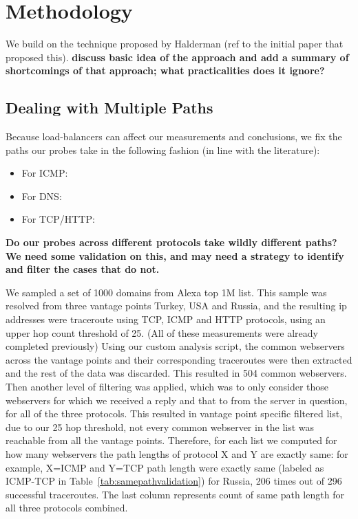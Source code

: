 \section{Methodology}\label{sec:methodology}
We build on the technique proposed by Halderman (ref to the initial paper that
proposed this).
\textbf{ discuss basic idea of the approach and add a summary of shortcomings
of that approach; what practicalities does it ignore?} 

\subsection{Dealing with Multiple Paths}
Because load-balancers can affect our measurements and conclusions, we fix the
paths our probes take in the following fashion (in line with the literature):
\begin{itemize}
    \item For ICMP:
    \item For DNS:
    \item For TCP/HTTP:
\end{itemize}
\textbf{Do our probes across different protocols take wildly different paths?
We need some validation on this, and may need a strategy to identify and filter
the cases that do not.}

We sampled a set of 1000 domains from Alexa top 1M list. This sample was resolved from three vantage points Turkey, USA and Russia, and the resulting ip addresses were traceroute using TCP, ICMP and HTTP protocols, using an upper hop count threshold of 25. (All of these measurements were already completed previously)
Using our custom analysis script, the common webservers across the vantage points and their corresponding traceroutes were then extracted and the rest of the data was discarded. This resulted in 504 common webservers. Then another level of filtering was applied, which was to only consider those webservers for which we received a reply and that to from the server in question, for all of the three protocols.
This resulted in vantage point specific filtered list, due to our 25 hop threshold, not every common webserver in the list was reachable from all the vantage points. Therefore, for each list we computed for how many webservers the path lengths of protocol X and Y are exactly same: for example, X=ICMP and Y=TCP path length were exactly same (labeled as ICMP-TCP in Table~\ref{tab:samepathvalidation}) for Russia, 206 times out of 296 successful traceroutes. The last column represents count of same path length for all three protocols combined.

